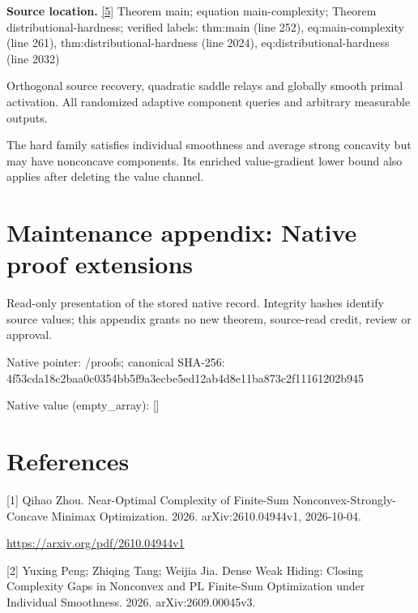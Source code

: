 \documentclass[10pt,a4paper]{article}
\begin{document}
\textbf{Source location.} \href{https://github.com/WU-Wendao/Colombo/blob/main/colombo_sensorium/Complexity_altas/data/sources/colombo/U06/manuscript.pdf}{[5]} Theorem main; equation main-complexity; Theorem distributional-hardness; verified labels: thm:main (line 252), eq:main-complexity (line 261), thm:distributional-hardness (line 2024), eq:distributional-hardness (line 2032)



Orthogonal source recovery, quadratic saddle relays and globally smooth primal activation. All randomized adaptive component queries and arbitrary measurable outputs.



The hard family satisfies individual smoothness and average strong concavity but may have nonconcave components. Its enriched value-gradient lower bound also applies after deleting the value channel.



\section{Maintenance appendix: Native proof extensions}


Read-only presentation of the stored native record. Integrity hashes identify source values; this appendix grants no new theorem, source-read credit, review or approval.



Native pointer: /proofs; canonical SHA-256: 4f53cda18c2baa0c0354bb5f\allowbreak{}9a3ecbe5ed12ab4d8e11ba87\allowbreak{}3c2f11161202b945



Native value (empty\_array): []



\section{References}


[1] Qihao Zhou. Near-Optimal Complexity of Finite-Sum Nonconvex-Strongly-Concave Minimax Optimization. 2026. arXiv:2610.04944v1, 2026-10-04.



\url{https://arxiv.org/pdf/2610.04944v1}



[2] Yuxing Peng; Zhiqing Tang; Weijia Jia. Dense Weak Hiding: Closing Complexity Gaps in Nonconvex and PL Finite-Sum Optimization under Individual Smoothness. 2026. arXiv:2609.00045v3.
\end{document}

